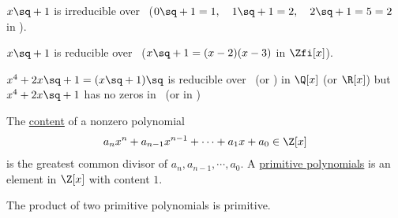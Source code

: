 \documentclass[a4paper]{article}
\begin{document}
\begin{example}
  \( x\sq + 1 \) is irreducible over \Zth\ (\( 0\sq+1=1,\quad 1\sq+1 = 2,\quad 2\sq + 1 = 5 = 2 \) in \Zth).

  \( x\sq + 1 \) is reducible over \Zfi\ (\( x\sq+1 = (x-2)(x-3) \) in \( \Zfi[x] \)).
\end{example}

\begin{example}
  \( x^4+2x\sq + 1 = (x\sq + 1)\sq \) is reducible over \Q\ (or \R) in \( \Q[x] \) (or \( \R[x] \)) but \( x^4+2x\sq + 1 \) has no zeros in \Q\ (or in \R)
\end{example}

\begin{definition}
The \ul{content} of a nonzero polynomial \begin{align*}
  a_nx^n + a_{n-1}x^{n-1} + \cdots + a_1x+a_0 \in \Z[x]
\end{align*}
is the greatest common divisor of \( a_n, a_{n-1}, \cdots, a_0 \). A \ul{primitive polynomials} is an element in \( \Z[x] \) with content \( 1 \).
\end{definition}

\begin{lemma}
  The product of two primitive polynomials is primitive.
\end{lemma}
\end{document}
